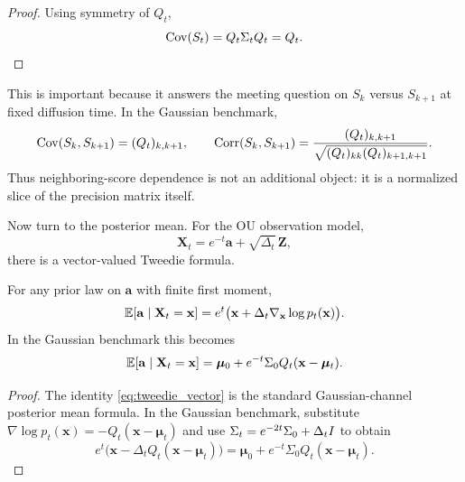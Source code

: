 \documentclass[11pt]{article}
\begin{document}
\begin{proof}
Using symmetry of $Q_t$,
\begin{equation}
 \operatorname{Cov}(S_t)=Q_t\Sigma_tQ_t=Q_t.
\end{equation}
\end{proof}

This is important because it answers the meeting question on $S_k$ versus $S_{k+1}$ at fixed diffusion time. In the Gaussian benchmark,
\begin{equation}
 \operatorname{Cov}(S_k,S_{k+1})=(Q_t)_{k,k+1},
 \qquad
 \operatorname{Corr}(S_k,S_{k+1})=\frac{(Q_t)_{k,k+1}}{\sqrt{(Q_t)_{kk}(Q_t)_{k+1,k+1}}}.
\end{equation}
Thus neighboring-score dependence is not an additional object: it is a normalized slice of the precision matrix itself.

Now turn to the posterior mean. For the OU observation model,
\begin{equation}
 \mathbf X_t=e^{-t}\mathbf a+\sqrt{\Delta_t}\,\mathbf Z,
\end{equation}
there is a vector-valued Tweedie formula.

\begin{proposition}\label{prop:tweedie_vector}
For any prior law on $\mathbf a$ with finite first moment,
\begin{equation}\label{eq:tweedie_vector}
 \mathbb{E}[\mathbf a\mid \mathbf X_t=\mathbf x]
 =e^t\big(\mathbf x+\Delta_t\nabla_{\mathbf x}\log p_t(\mathbf x)\big).
\end{equation}
In the Gaussian benchmark this becomes
\begin{equation}\label{eq:posterior_mean_gaussian}
 \mathbb{E}[\mathbf a\mid \mathbf X_t=\mathbf x]
 =\boldsymbol\mu_0+e^{-t}\Sigma_0Q_t(\mathbf x-\boldsymbol\mu_t).
\end{equation}
\end{proposition}

\begin{proof}
The identity \eqref{eq:tweedie_vector} is the standard Gaussian-channel posterior mean formula. In the Gaussian benchmark, substitute $\nabla\log p_t(\mathbf x)=-Q_t(\mathbf x-\boldsymbol\mu_t)$ and use $\Sigma_t=e^{-2t}\Sigma_0+\Delta_tI$ to obtain
\begin{equation}
 e^t\big(\mathbf x-\Delta_tQ_t(\mathbf x-\boldsymbol\mu_t)\big)
 =\boldsymbol\mu_0+e^{-t}\Sigma_0Q_t(\mathbf x-\boldsymbol\mu_t).
\end{equation}
\end{proof}
\end{document}
